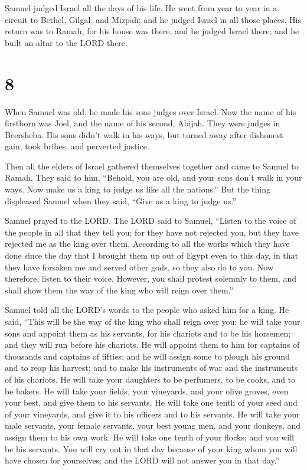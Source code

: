  Samuel judged Israel all the days of his life.
 He went from year to year in a circuit to Bethel, Gilgal,
and Mizpah; and he judged Israel in all those places.  His
return was to Ramah, for his house was there, and he judged Israel
there; and he built an altar to the LORD there.

\hypertarget{section-7}{%
\section{8}\label{section-7}}

 When Samuel was old, he made his sons judges over Israel.
 Now the name of his firstborn was Joel, and the name of his
second, Abijah. They were judges in Beersheba.  His sons
didn't walk in his ways, but turned away after dishonest gain, took
bribes, and perverted justice.

 Then all the elders of Israel gathered themselves together
and came to Samuel to Ramah.  They said to him, ``Behold,
you are old, and your sons don't walk in your ways. Now make us a king
to judge us like all the nations.''  But the thing
displeased Samuel when they said, ``Give us a king to judge us.''

Samuel prayed to the LORD.  The LORD said to Samuel,
``Listen to the voice of the people in all that they tell you; for they
have not rejected you, but they have rejected me as the king over them.
 According to all the works which they have done since the
day that I brought them up out of Egypt even to this day, in that they
have forsaken me and served other gods, so they also do to you.
 Now therefore, listen to their voice. However, you shall
protest solemnly to them, and shall show them the way of the king who
will reign over them.''

 Samuel told all the LORD's words to the people who asked
him for a king.  He said, ``This will be the way of the
king who shall reign over you: he will take your sons and appoint them
as his servants, for his chariots and to be his horsemen; and they will
run before his chariots.  He will appoint them to him for
captains of thousands and captains of fifties; and he will assign some
to plough his ground and to reap his harvest; and to make his
instruments of war and the instruments of his chariots.  He
will take your daughters to be perfumers, to be cooks, and to be bakers.
 He will take your fields, your vineyards, and your olive
groves, even your best, and give them to his servants.  He
will take one tenth of your seed and of your vineyards, and give it to
his officers and to his servants.  He will take your male
servants, your female servants, your best young men, and your donkeys,
and assign them to his own work.  He will take one tenth of
your flocks; and you will be his servants.  You will cry
out in that day because of your king whom you will have chosen for
yourselves; and the LORD will not answer you in that day.''


